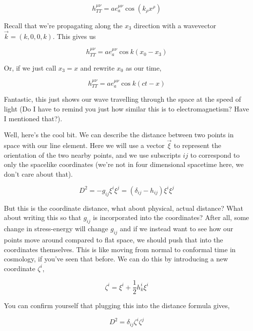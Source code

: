 \documentclass{article}
\newcommand{\umn}{^{\mu\nu}}
\begin{document}
\begin{equation}
    h_{TT}\umn = a e_a\umn\cos(k_\rho x^\rho)
\end{equation}

Recall that we're propagating along the $x_3$ direction with a wavevector $\vec{k} =(k,0,0,k)$. This gives us

\begin{equation}
    h_{TT}\umn = a e_a\umn\cos k(x_0 - x_3)
\end{equation}

Or, if we just call $x_3=x$ and rewrite $x_0$ as our time,

\begin{equation}
    h_{TT}\umn = a e_a\umn\cos k(ct - x)
\end{equation}

Fantastic, this just shows our wave travelling through the space at the speed of light (Do I have to remind you just how similar this is to electromagnetism? Have I mentioned that?).

Well, here's the cool bit. We can describe the distance between two points in space with our line element. Here we will use a vector $\vec{\xi}$ to represent the orientation of the two nearby points, and we use subscripts $ij$ to correspond to only the spacelike coordinates (we're not in four dimensional spacetime here, we don't care about that).

\begin{equation}
    D^2 = -g_{ij}\xi^i\xi^j = (\delta_{ij} - h_{ij})\xi^i\xi^j
\end{equation}

But this is the coordinate distance, what about physical, actual distance? What about writing this so that $g_{ij}$ is incorporated into the coordinates? After all, some change in stress-energy will change $g_{ij}$ and if we instead want to see how our points move around compared to flat space, we should push that into the coordinates themselves. This is like moving from normal to conformal time in cosmology, if you've seen that before. We can do this by introducing a new coordinate $\zeta^i$,

\begin{equation}
    \zeta^i = \xi^i + \frac{1}{2}h_k^i\xi^i
\end{equation}

You can confirm yourself that plugging this into the distance formula gives,

\begin{equation}
    D^2 = \delta_{ij}\zeta^i\zeta^j
\end{equation}
\end{document}
